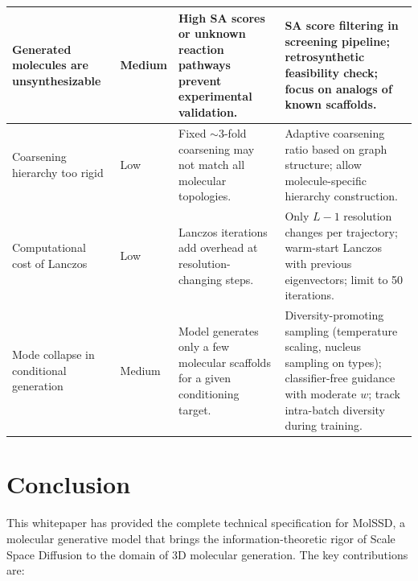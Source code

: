 \documentclass[12pt,a4paper]{article}
\begin{document}
\begin{longtable}{p{3.5cm}p{1.5cm}p{4cm}p{4cm}}
\midrule
Generated molecules are unsynthesizable & Medium & High SA scores or unknown reaction pathways prevent experimental validation. & SA score filtering in screening pipeline; retrosynthetic feasibility check; focus on analogs of known scaffolds. \\
\midrule
Coarsening hierarchy too rigid & Low & Fixed $\sim$3-fold coarsening may not match all molecular topologies. & Adaptive coarsening ratio based on graph structure; allow molecule-specific hierarchy construction. \\
\midrule
Computational cost of Lanczos & Low & Lanczos iterations add overhead at resolution-changing steps. & Only $L-1$ resolution changes per trajectory; warm-start Lanczos with previous eigenvectors; limit to 50 iterations. \\
\midrule
Mode collapse in conditional generation & Medium & Model generates only a few molecular scaffolds for a given conditioning target. & Diversity-promoting sampling (temperature scaling, nucleus sampling on types); classifier-free guidance with moderate $w$; track intra-batch diversity during training. \\
\bottomrule
\end{longtable}

\section{Conclusion}\label{sec:conclusion}

This whitepaper has provided the complete technical specification for MolSSD, a molecular generative model that brings the information-theoretic rigor of Scale Space Diffusion to the domain of 3D molecular generation. The key contributions are:
\end{document}
